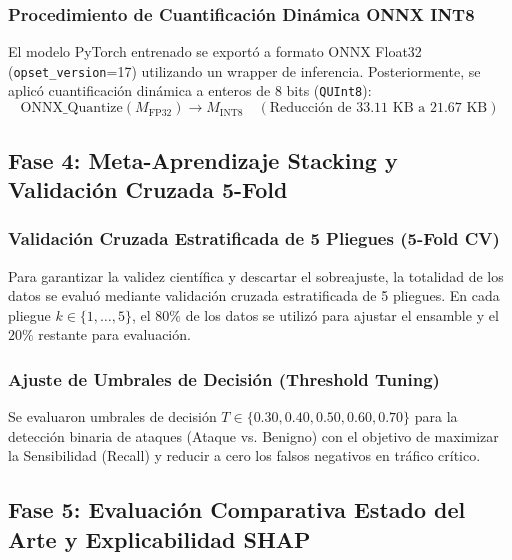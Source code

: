 \subsubsection{Procedimiento de Cuantificación Dinámica ONNX INT8}
El modelo PyTorch entrenado se exportó a formato ONNX Float32 (\texttt{opset\_version}=17) utilizando un wrapper de inferencia. Posteriormente, se aplicó cuantificación dinámica a enteros de 8 bits (\texttt{QUInt8}):
\begin{equation}
\text{ONNX\_Quantize}(M_{\text{FP32}}) \rightarrow M_{\text{INT8}} \quad (\text{Reducción de } 33.11\text{ KB a } 21.67\text{ KB})
\end{equation}

\subsection{Fase 4: Meta-Aprendizaje Stacking y Validación Cruzada 5-Fold}

\subsubsection{Validación Cruzada Estratificada de 5 Pliegues (5-Fold CV)}
Para garantizar la validez científica y descartar el sobreajuste, la totalidad de los datos se evaluó mediante validación cruzada estratificada de 5 pliegues. En cada pliegue $k \in \{1, \dots, 5\}$, el $80\%$ de los datos se utilizó para ajustar el ensamble y el $20\%$ restante para evaluación.

\subsubsection{Ajuste de Umbrales de Decisión (Threshold Tuning)}
Se evaluaron umbrales de decisión $T \in \{0.30, 0.40, 0.50, 0.60, 0.70\}$ para la detección binaria de ataques (Ataque vs. Benigno) con el objetivo de maximizar la Sensibilidad (Recall) y reducir a cero los falsos negativos en tráfico crítico.

\subsection{Fase 5: Evaluación Comparativa Estado del Arte y Explicabilidad SHAP}

